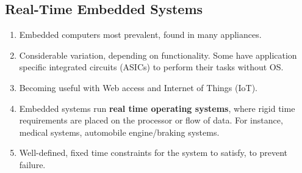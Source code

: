 \documentclass[journal,12pt,twocolumn]{IEEEtran}
\begin{document}
\subsection{Real-Time Embedded Systems}
\begin{enumerate}
    \item Embedded computers most prevalent, found in many appliances.
    \item Considerable variation, depending on functionality. Some have
    application specific integrated circuits (ASICs) to perform their 
    tasks without OS.
    \item Becoming useful with Web access and Internet of Things (IoT).
    \item Embedded systems run \textbf{real time operating systems}, 
    where rigid time requirements are placed on the processor or flow 
    of data. For instance, medical systems, automobile engine/braking systems.
    \item Well-defined, fixed time constraints for the system to satisfy, to 
    prevent failure.
\end{enumerate}
\end{document}
